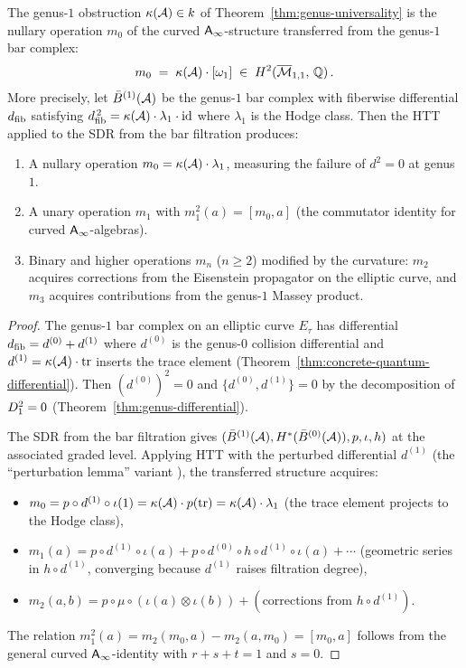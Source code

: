 \begin{proposition}
\label{prop:genus1-curvature-m0}
The genus-$1$ obstruction $\kappa(\mathcal{A}) \in k$ of
Theorem~\textup{\ref{thm:genus-universality}} is the nullary
operation $m_0$ of the curved $\mathsf{A}_{\infty}$-structure transferred from
the genus-$1$ bar complex:
\[
m_0 \;=\; \kappa(\mathcal{A}) \cdot [\omega_1]
\;\in\; H^2(\overline{\mathcal{M}}_{1,1},\, \mathbb{Q})\,.
\]
More precisely, let $\bar{B}^{(1)}(\mathcal{A})$ be the genus-$1$ bar complex
with fiberwise differential $d_{\mathrm{fib}}$ satisfying $d_{\mathrm{fib}}^{\,2} =
\kappa(\mathcal{A}) \cdot \lambda_1 \cdot \mathrm{id}$ where $\lambda_1$ is the
Hodge class.  Then the HTT applied to the SDR from the bar
filtration produces:
\begin{enumerate}[label=(\roman*)]
\item A nullary operation $m_0 = \kappa(\mathcal{A}) \cdot \lambda_1$,
measuring the failure of $d^2 = 0$ at genus~$1$.
\item A unary operation $m_1$ with $m_1^2(a) = [m_0, a]$
(the commutator identity for curved $\mathsf{A}_{\infty}$-algebras).
\item Binary and higher operations $m_n$ ($n \geq 2$) modified
by the curvature: $m_2$ acquires corrections from the
Eisenstein propagator on the elliptic curve, and $m_3$
acquires contributions from the genus-$1$ Massey product.
\end{enumerate}
\end{proposition}

\begin{proof}
The genus-$1$ bar complex on an elliptic curve $E_\tau$ has
differential $d_{\mathrm{fib}} = d^{(0)} + d^{(1)}$ where $d^{(0)}$ is the
genus-$0$ collision differential and $d^{(1)} = \kappa(\mathcal{A}) \cdot
\mathrm{tr}$ inserts the trace element
(Theorem~\ref{thm:concrete-quantum-differential}).
Then $(d^{(0)})^2 = 0$ and $\{d^{(0)}, d^{(1)}\} = 0$
by the decomposition of
$D_{1}^2 = 0$ (Theorem~\ref{thm:genus-differential}).

The SDR from the bar filtration gives
$(\bar{B}^{(1)}(\mathcal{A}), H^*(\bar{B}^{(0)}(\mathcal{A})), p, \iota, h)$
at the associated graded level.  Applying HTT with the perturbed
differential $d^{(1)}$ (the ``perturbation lemma'' variant
\cite{LV12}), the transferred structure acquires:
\begin{itemize}
\item $m_0 = p \circ d^{(1)} \circ \iota(1) = \kappa(\mathcal{A}) \cdot
p(\mathrm{tr}) = \kappa(\mathcal{A}) \cdot \lambda_1$ (the trace element
projects to the Hodge class),
\item $m_1(a) = p \circ d^{(1)} \circ \iota(a) + p \circ d^{(0)}
\circ h \circ d^{(1)} \circ \iota(a) + \cdots$
(geometric series in $h \circ d^{(1)}$, converging
because $d^{(1)}$ raises filtration degree),
\item $m_2(a,b) = p \circ \mu \circ (\iota(a) \otimes \iota(b))
+ (\text{corrections from } h \circ d^{(1)})$.
\end{itemize}
The relation $m_1^2(a) = m_2(m_0, a) - m_2(a, m_0) = [m_0, a]$
follows from the general curved $\mathsf{A}_{\infty}$-identity with $r+s+t = 1$
and $s = 0$.
\end{proof}

